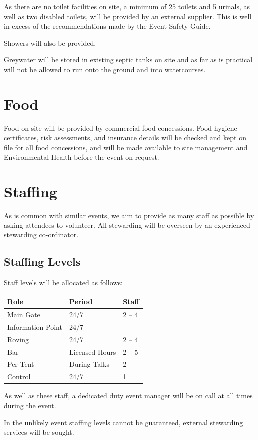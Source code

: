 As there are no toilet facilities on site, a minimum of 25 toilets and 5 urinals,
as well as two disabled toilets, will be provided by an external supplier. This
is well in excess of the recommendations made by the Event Safety Guide.

Showers will also be provided.

Greywater will be stored in existing septic tanks on site and as far as is practical
will not be allowed to run onto the ground and into watercourses.

\section{Food}

Food on site will be provided by commercial food concessions. Food hygiene certificates,
risk assessments, and insurance details will be checked and kept on file for all food
concessions, and will be made available to site management and Environmental Health before
the event on request.

\section{Staffing}

As is common with similar events, we aim to provide as many staff as possible
by asking attendees to volunteer. All stewarding will be overseen by an
experienced stewarding co-ordinator.

\subsection{Staffing Levels}

Staff levels will be allocated as follows:

\begin{tabular}{l l l}
Role & Period & Staff \\
\hline
Main Gate & 24/7 & 2 -- 4 \\
Information Point & 24/7 & \\
Roving & 24/7 & 2 -- 4 \\
Bar & Licensed Hours & 2 -- 5 \\
Per Tent & During Talks & 2 \\
Control & 24/7 & 1
\end{tabular}

As well as these staff, a dedicated duty event manager will be on call at all times during the event.

In the unlikely event staffing levels cannot be guaranteed, external stewarding services will be sought.

